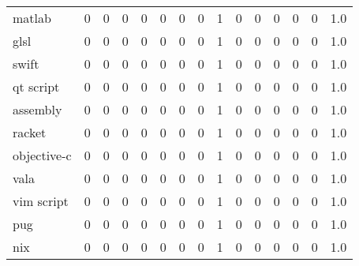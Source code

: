 \begin{tabular}{lrrrrrrrrrrrrrr}
matlab           &        0 &       0 &          0 &               0 &                0 &       0 &          0 &          1 &         0 &         0 &      0 &             0 &         0 &      1.0 \\
glsl             &        0 &       0 &          0 &               0 &                0 &       0 &          0 &          1 &         0 &         0 &      0 &             0 &         0 &      1.0 \\
swift            &        0 &       0 &          0 &               0 &                0 &       0 &          0 &          1 &         0 &         0 &      0 &             0 &         0 &      1.0 \\
qt script        &        0 &       0 &          0 &               0 &                0 &       0 &          0 &          1 &         0 &         0 &      0 &             0 &         0 &      1.0 \\
assembly         &        0 &       0 &          0 &               0 &                0 &       0 &          0 &          1 &         0 &         0 &      0 &             0 &         0 &      1.0 \\
racket           &        0 &       0 &          0 &               0 &                0 &       0 &          0 &          1 &         0 &         0 &      0 &             0 &         0 &      1.0 \\
objective-c      &        0 &       0 &          0 &               0 &                0 &       0 &          0 &          1 &         0 &         0 &      0 &             0 &         0 &      1.0 \\
vala             &        0 &       0 &          0 &               0 &                0 &       0 &          0 &          1 &         0 &         0 &      0 &             0 &         0 &      1.0 \\
vim script       &        0 &       0 &          0 &               0 &                0 &       0 &          0 &          1 &         0 &         0 &      0 &             0 &         0 &      1.0 \\
pug              &        0 &       0 &          0 &               0 &                0 &       0 &          0 &          1 &         0 &         0 &      0 &             0 &         0 &      1.0 \\
nix              &        0 &       0 &          0 &               0 &                0 &       0 &          0 &          1 &         0 &         0 &      0 &             0 &         0 &      1.0 \\

\end{tabular}
